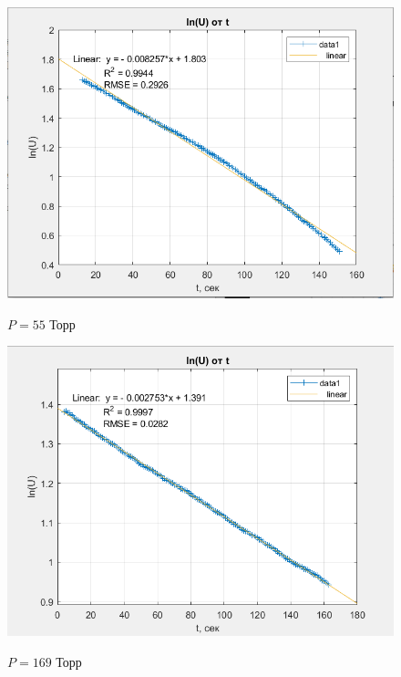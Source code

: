 \documentclass[a4paper, 12pt]{article} %
\begin{document}
\begin{figure}[h]
    \centering
    \includegraphics[width = 10.5 cm]{2gr55}
    \label{fig:vac}
    
    \begin{center}
		\caption{$P = 55$ Торр}
    \end{center}
\end{figure} 

\begin{figure}[h]
    \centering
    \includegraphics[width = 10.5 cm]{2gr169}
    \label{fig:vac}
    
    \begin{center}
		\caption{$P = 169$ Торр}
    \end{center}
\end{figure} 
\end{document}
